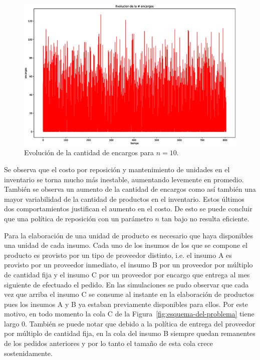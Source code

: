 \documentclass[10pt]{article}
\begin{document}
\begin{figure}[h] 
	\centering 
	\includegraphics[width=1\textwidth]{img/EvolucionEncargos10} 
	\caption{Evolución de la cantidad de encargos para $n=10$.} 
	\label{fig:EvolucionEncargos10} 
\end{figure}
\FloatBarrier
Se observa que el costo por reposición y mantenimiento de unidades en el inventario se torna mucho más inestable, aumentando levemente en promedio. También se observa un aumento de la cantidad de encargos como así también una mayor variabilidad de la cantidad de productos en el inventario. Estos últimos dos comportamientos justifican el aumento en el costo.
De esto se puede concluir que una política de reposición con un parámetro $n$ tan bajo no resulta eficiente.

Para la elaboración de una unidad de producto es necesario que haya disponibles una unidad de cada insumo. Cada uno de los insumos de los que se compone el producto es provisto por un tipo de proveedor distinto, i.e. el insumo A es provisto por un proveedor inmediato, el insumo B por un proveedor por múltiplo de cantidad fija y el insumo C por un proveedor por encargo que entrega al mes siguiente de efectuado el pedido. En las simulaciones se pudo observar que cada vez que arriba el insumo C se consume al instante en la elaboración de productos pues los insumos A y B ya estaban previamente disponibles para ellos. Por este motivo, en todo momento la cola C de la Figura~\ref{fig:esquema-del-problema} tiene largo $0$. También se puede notar que debido a la política de entrega del proveedor por múltiplo de cantidad fija, en la cola del insumo B siempre quedan remanentes de los pedidos anteriores y por lo tanto el tamaño de esta cola crece sostenidamente.
\end{document}
